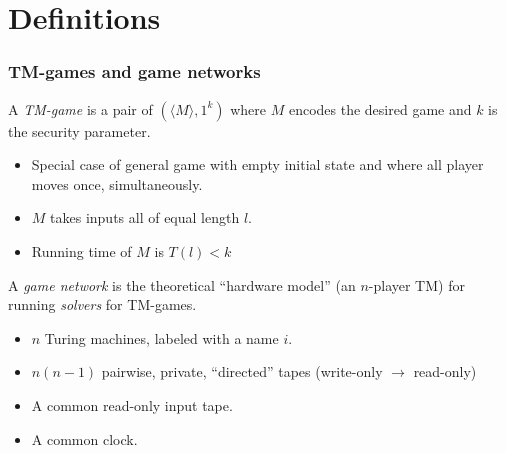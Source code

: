 \documentclass[10pt]{beamer}
\begin{document}
\section{Definitions}

\begin{frame}
\frametitle{TM-games and game networks}

A \textit{TM-game} is a pair of $(\langle M\rangle ,1^k)$ where $M$
encodes the desired game and $k$ is the security parameter.
\begin{itemize}
\item Special case of general game with empty initial state and where all
player moves once, simultaneously.
\item $M$ takes inputs all of equal length $l$.
\item Running time of $M$ is $T(l) < k$
\end{itemize}

A \textit{game network} is the theoretical ``hardware model''
 (an $n$-player TM) for running \textit{solvers} for TM-games.

\begin{itemize}
\item $n$ Turing machines, labeled with a name $i$.
\item $n(n-1)$ pairwise, private, ``directed'' tapes (write-only $\rightarrow$ read-only)
\item A common read-only input tape.
\item A common clock.
\end{itemize}

\end{frame}
\end{document}
